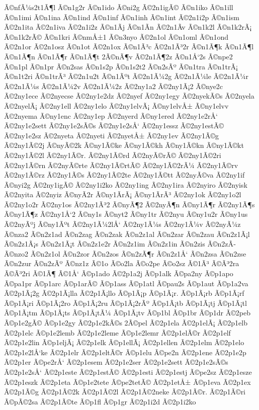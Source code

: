 {Ã©nfÃ¼s2t1Ã¶l
Ã©n1g2r
Ã©n1ido
Ã©ni2g
Ã©2n1igÃ©
Ã©n1iko
Ã©n1ill
Ã©n1imi
Ã©n1ina
Ã©n1ind
Ã©n1inf
Ã©n1inh
Ã©n1int
Ã©2n1i2p
Ã©n1ism
Ã©2n1ita
Ã©2n1iva
Ã©2n1i2z
Ã©n1Ã­j
Ã©n1Ã­n
Ã©2n1Ã­v
Ã©n1k2l
Ã©n1k2rÃ¡
Ã©n1k2rÃ©
Ã©n1kri
Ã©nmÅ±1
Ã©n3nyo
Ã©2n1ol
Ã©n1oml
Ã©n1ond
Ã©2n1or
Ã©2n1osz
Ã©n1ot
Ã©2n1ox
Ã©n1Ã³c
Ã©2n1Ã³2r
Ã©n1Ã¶k
Ã©n1Ã¶l
Ã©n1Ã¶n
Ã©n1Ã¶r
Ã©n1Ã¶t
2Ã©nÃ¶v
Ã©2n1Ã¶2z
Ã©n1Å‘2s
Ã©npe2
Ã©n1pl
Ã©n1pr
Ã©n2sas
Ã©n1s2p
Ã©n1s2t2
Ã©n2sÃº
Ã©n1tra
Ã©n1trÃ¡
Ã©n1t2ri
Ã©n1trÃ³
Ã©2n1u2t
Ã©n1Ãºt
Ã©2n1Ã¼2g
Ã©2n1Ã¼le
Ã©2n1Ã¼r
Ã©2n1Ã¼s
Ã©2n1Ã¼2v
Ã©2n1Ã¼2z
Ã©2ny1a2
Ã©2ny1Ã¡2
Ã©nye2c
Ã©2ny1ece
Ã©2nyecse
Ã©2ny1e2dz
Ã©2nyef
Ã©2ny1egy
Ã©2nyekÃ©s
Ã©2nyela
Ã©2nyelÃ¡
Ã©2ny1ell
Ã©2ny1elo
Ã©2ny1elvÃ¡
Ã©ny1elvÅ±
Ã©ny1elvv
Ã©2nyema
Ã©ny1enc
Ã©2ny1ep
Ã©2nyerd
Ã©ny1ered
Ã©2ny1e2rÅ‘
Ã©2ny1e2sett
Ã©2ny1e2sÃ©s
Ã©2ny1e2sÅ‘
Ã©2ny1essz
Ã©2ny1estÃ©
Ã©2ny1e2sz
Ã©2nyeta
Ã©2nyeti
Ã©2nyetÅ±
Ã©2ny1ev
Ã©2ny1Ã©g
Ã©2ny1Ã©2j
Ã©nyÃ©2k
Ã©ny1Ã©ke
Ã©ny1Ã©kh
Ã©ny1Ã©kn
Ã©ny1Ã©kt
Ã©2ny1Ã©2l
Ã©2ny1Ã©r.
Ã©2ny1Ã©rd
Ã©2nyÃ©rÃ©
Ã©2ny1Ã©2ri
Ã©2ny1Ã©rn
Ã©2nyÃ©rte
Ã©2ny1Ã©rtÃ©
Ã©2ny1Ã©2rÃ¼
Ã©2ny1Ã©rv
Ã©2ny1Ã©rz
Ã©2ny1Ã©s
Ã©2ny1Ã©2te
Ã©2ny1Ã©tt
Ã©2nyÃ©va
Ã©2ny1if
Ã©nyi2g
Ã©2ny1igÃ©
Ã©2ny1i2ko
Ã©2ny1ing
Ã©2ny1ira
Ã©2nyiro
Ã©2nyisk
Ã©2nyita
Ã©2nyiz
Ã©nyÃ­2r
Ã©ny1Ã­rÃ¡
Ã©ny1Ã­rÃ³
Ã©2ny1ok
Ã©2ny1o2l
Ã©2ny1o2r
Ã©2ny1os
Ã©2ny1Ã³2
Ã©nyÃ¶2
Ã©2nyÃ¶n
Ã©ny1Ã¶r
Ã©2ny1Ã¶s
Ã©ny1Ã¶z
Ã©2ny1Å‘2
Ã©ny1s
Ã©nyt2
Ã©ny1tr
Ã©2nyu
Ã©ny1u2r
Ã©ny1us
Ã©2nyÃºj
Ã©ny1Ãºt
Ã©2ny1Ã¼2lÅ‘
Ã©2ny1Ã¼s
Ã©2ny1Ã¼v
Ã©2nyÃ¼z
Ã©nza2
Ã©n2z1ad
Ã©n2zag
Ã©n2zak
Ã©n2z1al
Ã©n2zar
Ã©n2zau
Ã©n2z1Ã¡l
Ã©n2z1Ã¡s
Ã©n2z1Ã¡t
Ã©n2z1e2r
Ã©n2z1im
Ã©n2z1in
Ã©n2zis
Ã©n2zÃ­
Ã©nzo2
Ã©n2z1ol
Ã©n2zor
Ã©n2zos
Ã©n2zÃ¶r
Ã©n2z1Å‘
Ã©n2zsa
Ã©n2zse
Ã©n2zur
Ã©n2zÃº
Ã©nz1z
Ã©1o
Ã©o2la
Ã©o2pe
Ã©o2sz
Ã©1Ã³
Ã©Ã³2ra
Ã©Ã³2ri
Ã©1Ã¶
Ã©1Å‘
Ã©p1ado
Ã©2p1a2j
Ã©p1alk
Ã©pa2ny
Ã©p1apo
Ã©pa1pr
Ã©p1arc
Ã©p1arÃ©
Ã©p1ass
Ã©p1atl
Ã©pau2s
Ã©p1aut
Ã©p1a2va
Ã©2p1Ã¡2g
Ã©2p1Ã¡lla
Ã©2p1Ã¡llo
Ã©p1Ã¡p
Ã©p1Ã¡r.
Ã©p1Ã¡rb
Ã©p1Ã¡rf
Ã©p1Ã¡ri
Ã©p1Ã¡2ro
Ã©p1Ã¡2ru
Ã©p1Ã¡2rÃº
Ã©p1Ã¡tb
Ã©p1Ã¡tj
Ã©p1Ã¡tl
Ã©p1Ã¡tm
Ã©p1Ã¡ts
Ã©p1Ã¡tÃ¼
Ã©p1Ã¡tv
Ã©p1bl
Ã©p1br
Ã©p1dr
Ã©2peb
Ã©p1e2gÃ©
Ã©p1e2gy
Ã©2p1e2kÃ©s
2Ã©pel
Ã©2p1ela
Ã©2p1elÃ¡
Ã©2p1elb
Ã©2p1elc
Ã©p1e2lemb
Ã©2p1e2leme
Ã©p1e2lemr
Ã©2p1elÃ©r
Ã©2p1elf
Ã©2p1e2lin
Ã©p1eljÃ¡
Ã©2p1elk
Ã©p1ellÃ¡
Ã©2p1ellen
Ã©2p1elm
Ã©2p1elo
Ã©2p1e2lÅ‘ke
Ã©2p1elr
Ã©2p1eltÃ©r
Ã©p1elu
Ã©pe2n
Ã©2p1ene
Ã©2p1e2p
Ã©2p1er
Ã©pe2rÅ‘
Ã©2p1esem
Ã©2p1e2ser
Ã©2p1e2sett
Ã©2p1e2sÃ©s
Ã©2p1e2sÅ‘
Ã©2p1este
Ã©2p1estÃ©
Ã©2p1esti
Ã©2p1estj
Ã©pe2sz
Ã©2p1esze
Ã©2p1eszk
Ã©2p1eta
Ã©p1e2tete
Ã©pe2tetÃ©
Ã©2p1etÅ±
Ã©p1eva
Ã©2p1ex
Ã©2p1Ã©g
Ã©2p1Ã©2k
Ã©2p1Ã©2l
Ã©2p1Ã©2neke
Ã©2p1Ã©r.
Ã©2p1Ã©ri
Ã©pÃ©2sa
Ã©2p1Ã©te
Ã©p1fl
Ã©p1gr
Ã©2p1i2d
Ã©2p1i2ko
}
